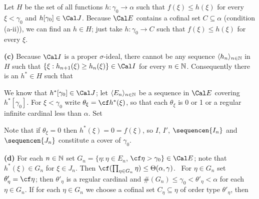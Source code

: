 {Let $H$ be the set of all functions $h:\gamma_0\to\alpha$ such that
$f(\xi)\le h(\xi)$ for every $\xi<\gamma_0$ and
$h[\gamma_0]\in\Cal J$.   Because
$\Cal E$ contains a cofinal set $C\subseteq\alpha$ (condition (a-ii)),
we can find an
$h\in H$;  just take $h:\gamma_0\to C$ such that $f(\xi)\le h(\xi)$
for every $\xi$.

\medskip

{\bf (c)} Because $\Cal I$ is a proper
$\sigma$-ideal, there cannot be any sequence
$\langle h_n\rangle_{n\in\Bbb N}$ in $H$ such that
$\{\xi:h_{n+1}(\xi)\ge h_n(\xi)\}\in\Cal I$ for every $n\in\Bbb N$.
Consequently there is an $h^*\in H$ such that


\noindent We know that $h^*[\gamma_0]\in\Cal J$;  let
$\langle E_n\rangle_{n\in\Bbb N}$ be a sequence in $\Cal E$ covering
$h^*[\gamma_0]$.
For $\xi<\gamma_0$ write $\theta_{\xi}=\cf h^*(\xi)$, so that
each $\theta_{\xi}$ is 0 or
1 or a regular infinite cardinal less than $\alpha$.   Set





\noindent Note that if $\theta_{\xi}=0$ then $h^*(\xi)=0=f(\xi)$, so
$I$, $I'$, $\sequencen{I_n}$ and $\sequencen{J_n}$ constitute a cover
of $\gamma_0$.

\medskip

{\bf (d)} For each $n\in\Bbb N$ set
$G_n=\{\eta:\eta\in E_n$, $\cf\eta>\gamma_0\}\in\Cal E$;  note that
$h^*(\xi)\in G_n$ for $\xi\in J_n$.   Then
$\cf(\prod_{\eta\in G_n}\eta)\le\Theta(\alpha,\gamma)$.   \Prf\
For $\eta\in G_n$ set $\theta'_{\eta}=\cf\eta$;  then $\theta'_{\eta}$
is a regular cardinal and $\#(G_n)\le\gamma_0<\theta'_{\eta}<\alpha$
for each $\eta\in G_n$.   If for each $\eta\in G_n$ we choose a
cofinal set $C_{\eta}\subseteq\eta$ of order type $\theta'_{\eta}$,
then


}
